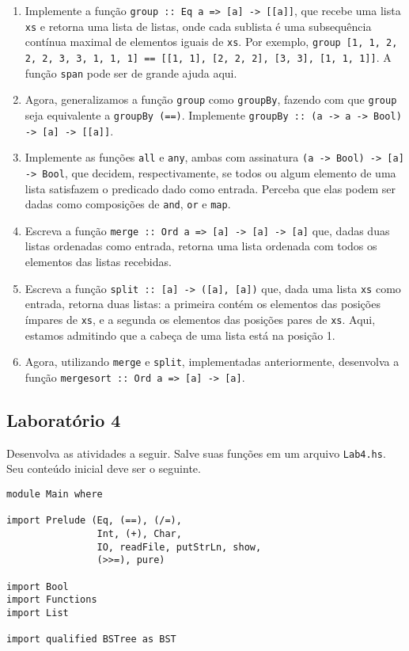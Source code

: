 \documentclass[a4paper]{article}
\begin{document}
\begin{enumerate}
	\item
		Implemente a função \texttt{group :: Eq a => [a] -> [[a]]}, que recebe uma lista \texttt{xs} e retorna uma lista de listas, onde cada sublista é uma subsequência contínua maximal de elementos iguais de \texttt{xs}.
		Por exemplo, \texttt{group [1, 1, 2, 2, 2, 3, 3, 1, 1, 1] == [[1, 1], [2, 2, 2], [3, 3], [1, 1, 1]]}.
		A função \texttt{span} pode ser de grande ajuda aqui.
	\item 
		Agora, generalizamos a função \texttt{group} como \texttt{groupBy}, fazendo com que \texttt{group} seja equivalente a \texttt{groupBy (==)}.
		Implemente \texttt{groupBy :: (a -> a -> Bool) -> [a] -> [[a]]}.
	\item
		Implemente as funções \texttt{all} e \texttt{any}, ambas com assinatura \texttt{(a -> Bool) -> [a] -> Bool}, que decidem, respectivamente, se todos ou algum elemento de uma lista satisfazem o predicado dado como entrada.
		Perceba que elas podem ser dadas como composições de \texttt{and}, \texttt{or} e \texttt{map}.
	\item
		Escreva a função \texttt{merge :: Ord a => [a] -> [a] -> [a]} que, dadas duas listas ordenadas como entrada, retorna uma lista ordenada com todos os elementos das listas recebidas.
	\item
		Escreva a função \texttt{split :: [a] -> ([a], [a])} que, dada uma lista \texttt{xs} como entrada, retorna duas listas: a primeira contém os elementos das posições ímpares de \texttt{xs}, e a segunda os elementos das posições pares de \texttt{xs}.
		Aqui, estamos admitindo que a cabeça de uma lista está na posição 1.
	\item
		Agora, utilizando \texttt{merge} e \texttt{split}, implementadas anteriormente, desenvolva a função \texttt{mergesort :: Ord a => [a] -> [a]}.
\end{enumerate}

\subsection{Laboratório 4}	\label{lab4}

Desenvolva as atividades a seguir.
Salve suas funções em um arquivo \texttt{Lab4.hs}.
Seu conteúdo inicial deve ser o seguinte.

\begin{verbatim}
module Main where

import Prelude (Eq, (==), (/=),
                Int, (+), Char,
                IO, readFile, putStrLn, show,
                (>>=), pure)

import Bool
import Functions
import List

import qualified BSTree as BST
\end{verbatim}
\end{document}
